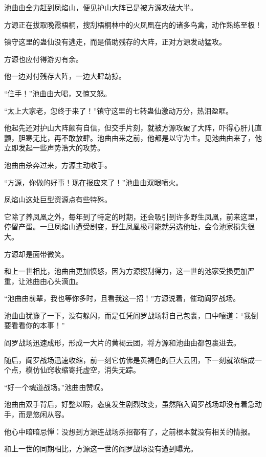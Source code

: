 
\begin{this_body}

池曲由全力赶到凤焰山，便见护山大阵已是被方源攻破大半。

方源正在拔取晚霞梧桐，搜刮梧桐林中的火凤凰在内的诸多鸟禽，动作熟练至极！

镇守这里的蛊仙没有逃走，而是借助残存的大阵，正对方源发动猛攻。

方源也应付得游刃有余。

他一边对付残存大阵，一边大肆劫掠。

“住手！”池曲由大喝，又惊又怒。

“太上大家老，您终于来了！”镇守这里的七转蛊仙激动万分，热泪盈眶。

他起先还对护山大阵颇有自信，但交手片刻，就被方源攻破了大阵，吓得心肝儿直颤，胆寒无比，再不敢放肆。池曲由来之前，他都是以守为主。见池曲由来了，他立即发起一些声势浩大的攻势。

池曲由杀奔过来，方源主动收手。

“方源，你做的好事！现在报应来了！”池曲由双眼喷火。

凤焰山这处巨型资源点有些特殊。

它除了养凤凰之外，每年到了特定的时期，还会吸引到许多野生凤凰，前来这里，停留产蛋。一旦凤焰山遭受剧变，野生凤凰极可能就另选他址，会令池家损失很大。

方源却是面带微笑。

和上一世相比，池曲由更加愤怒，因为方源搜刮得力，这一世的池家受损更加严重，让池曲由心头滴血。

“池曲由前辈，我也等你多时，且看我这一招！”方源说着，催动阎罗战场。

池曲由犹豫了一下，没有躲闪，而是任凭阎罗战场将自己包裹，口中嚷道：“我倒要看看你的本事！”

阎罗战场迅速成形，形成一大片的黄褐云团，将方源和池曲由都包裹进去。

随后，阎罗战场迅速收缩，前一刻它仿佛是黄褐色的巨大云团，下一刻就浓缩成一个点，模仿仙窍收缩寄托虚空，消失无踪。

“好一个魂道战场。”池曲由赞叹。

池曲由双手背后，好整以暇，态度发生剧烈改变，虽然陷入阎罗战场却没有着急动手，而是悠闲从容。

他心中暗暗忌惮：没想到方源连战场杀招都有了，之前根本就没有相关的情报。

和上一世的同期相比，方源这一世的阎罗战场没有遭到曝光。


\end{this_body}
